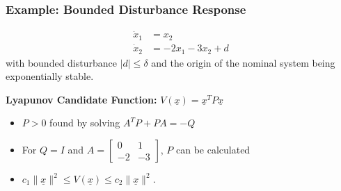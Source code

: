 \documentclass[student, noshadow, lsr, english, aspectratio=169, t]{ITR_LSR_slides}
\begin{document}
\begin{frame}
    \frametitle{Example: Bounded Disturbance Response}
	\vspace{-0.5cm}
    \begin{tcolorbox}[title=Problem: Analyze Boundedness of a Perturbed Mass-Spring-Damper-System]
		\vspace{-0.4cm}
        \begin{align*}
            \dot{x}_1 &= x_2 \\ %
            \dot{x}_2 &= -2x_1 - 3x_2 + d
        \end{align*}
        with bounded disturbance $|d| \leq \delta$ and the origin of the nominal system being exponentially stable.
    \end{tcolorbox}

    \vspace{0.3cm}
    \textbf{Lyapunov Candidate Function:} $V(\underline{x}) = \underline{x}^T P \underline{x}$
    \begin{itemize}
        \item $P > 0$ found by solving $A^T P + P A = -Q$
        \item For $Q=I$ and $A = \begin{bmatrix} 0 & 1 \\ -2 & -3 \end{bmatrix}$, $P$ can be calculated
        \item $c_1 \|\underline{x}\|^2 \leq V(\underline{x}) \leq c_2 \|\underline{x}\|^2$.
    \end{itemize}

\end{frame}
\end{document}
